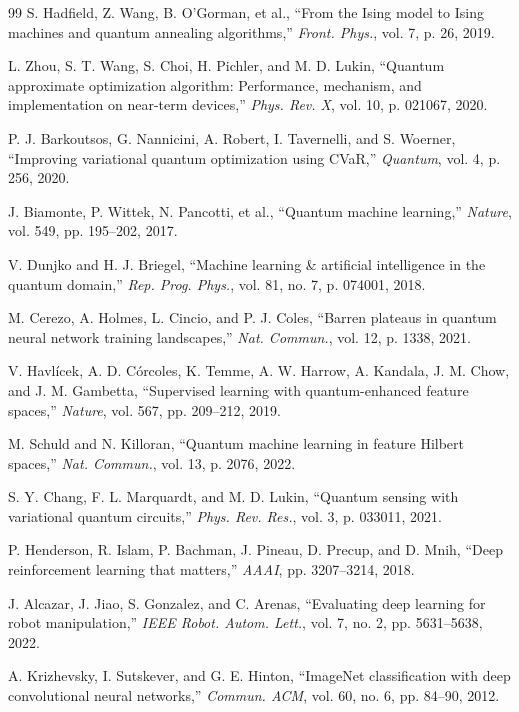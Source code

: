 \documentclass[conference]{IEEEtran}
\begin{document}
\begin{thebibliography}{99}
 S. Hadfield, Z. Wang, B. O'Gorman, et al., ``From the Ising model to Ising machines and quantum annealing algorithms,'' \textit{Front. Phys.}, vol. 7, p. 26, 2019.

 L. Zhou, S. T. Wang, S. Choi, H. Pichler, and M. D. Lukin, ``Quantum approximate optimization algorithm: Performance, mechanism, and implementation on near-term devices,'' \textit{Phys. Rev. X}, vol. 10, p. 021067, 2020.

 P. J. Barkoutsos, G. Nannicini, A. Robert, I. Tavernelli, and S. Woerner, ``Improving variational quantum optimization using CVaR,'' \textit{Quantum}, vol. 4, p. 256, 2020.

 J. Biamonte, P. Wittek, N. Pancotti, et al., ``Quantum machine learning,'' \textit{Nature}, vol. 549, pp. 195--202, 2017.

 V. Dunjko and H. J. Briegel, ``Machine learning \& artificial intelligence in the quantum domain,'' \textit{Rep. Prog. Phys.}, vol. 81, no. 7, p. 074001, 2018.

 M. Cerezo, A. Holmes, L. Cincio, and P. J. Coles, ``Barren plateaus in quantum neural network training landscapes,'' \textit{Nat. Commun.}, vol. 12, p. 1338, 2021.

 V. Havl\'icek, A. D. C\'orcoles, K. Temme, A. W. Harrow, A. Kandala, J. M. Chow, and J. M. Gambetta, ``Supervised learning with quantum-enhanced feature spaces,'' \textit{Nature}, vol. 567, pp. 209--212, 2019.

 M. Schuld and N. Killoran, ``Quantum machine learning in feature Hilbert spaces,'' \textit{Nat. Commun.}, vol. 13, p. 2076, 2022.

 S. Y. Chang, F. L. Marquardt, and M. D. Lukin, ``Quantum sensing with variational quantum circuits,'' \textit{Phys. Rev. Res.}, vol. 3, p. 033011, 2021.

 P. Henderson, R. Islam, P. Bachman, J. Pineau, D. Precup, and D. Mnih, ``Deep reinforcement learning that matters,'' \textit{AAAI}, pp. 3207--3214, 2018.

 J. Alcazar, J. Jiao, S. Gonzalez, and C. Arenas, ``Evaluating deep learning for robot manipulation,'' \textit{IEEE Robot. Autom. Lett.}, vol. 7, no. 2, pp. 5631--5638, 2022.

 A. Krizhevsky, I. Sutskever, and G. E. Hinton, ``ImageNet classification with deep convolutional neural networks,'' \textit{Commun. ACM}, vol. 60, no. 6, pp. 84--90, 2012.


\end{thebibliography}
\end{document}
